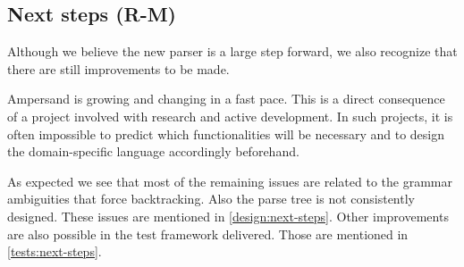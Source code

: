 
\subsection{Next steps (R-M)}
Although we believe the new parser is a large step forward, we also recognize that there are still improvements to be made.

Ampersand is growing and changing in a fast pace.
This is a direct consequence of a project involved with research and active development.
In such projects, it is often impossible to predict which functionalities will be necessary and to design the domain-specific language accordingly beforehand.

As expected we see that most of the remaining issues are related to the grammar ambiguities that force backtracking.
Also the parse tree is not consistently designed.
These issues are mentioned in \autoref{design:next-steps}.
Other improvements are also possible in the test framework delivered.
Those are mentioned in \autoref{tests:next-steps}.
